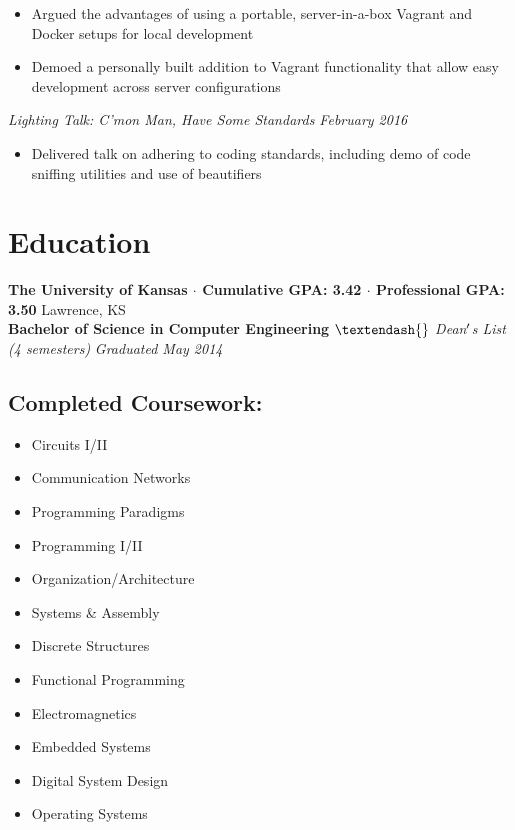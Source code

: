 \documentclass[10pt]{article}
\begin{document}
\vspace{-1em}
\begin{itemize}
  \item Argued the advantages of using a portable, server-in-a-box Vagrant and Docker setups for local development
  \item Demoed a personally built addition to Vagrant functionality that allow easy development across server configurations
\end{itemize}
\textit{Lighting Talk: C'mon Man, Have Some Standards \hfill February 2016} \\
\vspace{-1em}
\begin{itemize}
  \item Delivered talk on adhering to coding standards, including demo of code sniffing utilities and use of beautifiers
\end{itemize}

\section*{Education}
\textbf{The University of Kansas $\cdot$ Cumulative GPA: 3.42 $\cdot$ Professional GPA: 3.50}
\hfill
Lawrence, KS \\
\textbf{Bachelor of Science in Computer Engineering}
\textit{$\textendash{}$ Dean$\rq$s List (4 semesters)}
\hfill
\textit{Graduated May 2014}
\subsection*{Completed Coursework:}
\begin{multicols}{4}
  \begin{itemize}
    \item Circuits I/II
    \item Communication Networks
    \item Programming Paradigms
    \item Programming I/II
    \item Organization/Architecture
    \item Systems \& Assembly
    \item Discrete Structures
    \item Functional Programming
    \item Electromagnetics
    \item Embedded Systems
    \item Digital System Design
    \item Operating Systems
  \end{itemize}
\end{multicols}
\end{document}
